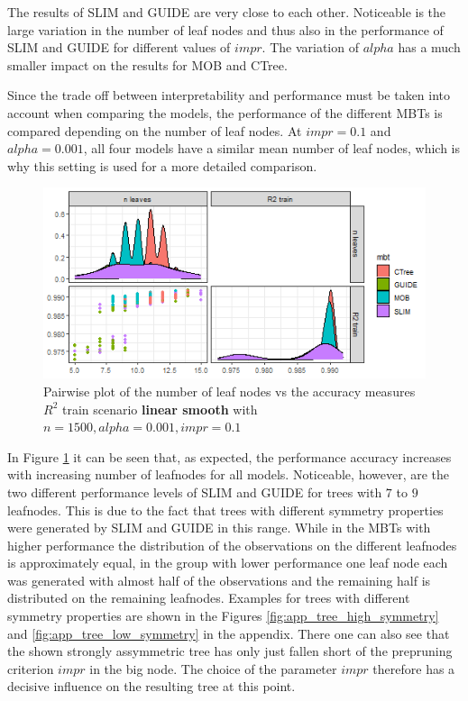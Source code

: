The results of SLIM and GUIDE are very close to each other. Noticeable is the large variation in the number of leaf nodes and thus also in the performance of SLIM and GUIDE for different values of $impr$. The variation of $alpha$ has a much smaller impact on the results for MOB and CTree.

Since the trade off between interpretability and performance must be taken into account when comparing the models, the performance of the different MBTs is compared depending on the number of leaf nodes. 
At $impr = 0.1$ and $alpha = 0.001$, all four models have a similar mean number of leaf nodes, which is why this setting is used for a more detailed comparison.

\begin{figure}[!htb] 
\centering
    \includegraphics[width=12cm]{Figures/simulations/batchtools/basic_scenarios/linear_smooth/ls_1000_standalone_r2_nleaves.png}
    \caption{Pairwise plot of the number of leaf nodes vs the accuracy measures $R^2$ train scenario \textbf{linear smooth} with $n=1500, alpha = 0.001, impr = 0.1$}
    \label{fig:ls_1000_standalone_r2_nleaves}
\end{figure} 


In Figure \ref{fig:ls_1000_standalone_r2_nleaves} it can be seen that, as expected, the performance accuracy increases with increasing number of leafnodes for all models. Noticeable, however, are the two different performance levels of SLIM and GUIDE for trees with $7$ to $9$ leafnodes. This is due to the fact that trees with different symmetry properties were generated by SLIM and GUIDE in this range. While in the MBTs with higher performance the distribution of the observations on the different leafnodes is approximately equal, in the group with lower performance one leaf node each was generated with almost half of the observations and the remaining half is distributed on the remaining leafnodes. Examples for trees with different symmetry properties are shown in the Figures \ref{fig:app_tree_high_symmetry} and \ref{fig:app_tree_low_symmetry} in  the appendix. There one can also see that the shown strongly assymmetric tree has only just fallen short of the prepruning criterion $impr$ in the big node. The choice of the parameter $impr$ therefore has a decisive influence on the resulting tree at this point.





